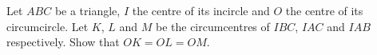 Let $ABC$ be a triangle, $I$ the centre of its incircle and $O$ the centre of its circumcircle. Let $K$, $L$ and $M$ be the circumcentres of $IBC$, $IAC$ and $IAB$ respectively. Show that $OK = OL = OM$.
